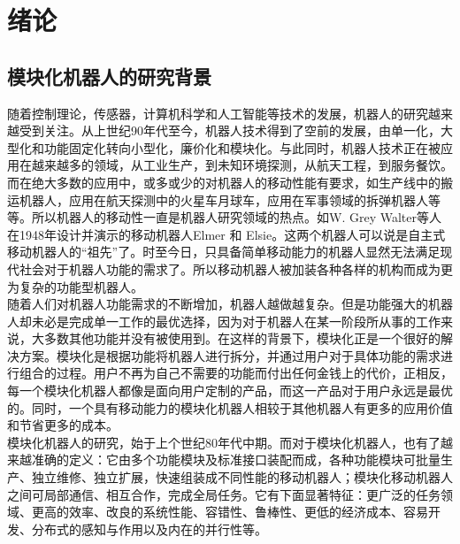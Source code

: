 
\chapter{绪论}
\label{chap:introduction}

\section{模块化机器人的研究背景}

随着控制理论，传感器，计算机科学和人工智能等技术的发展，机器人的研究越来越受到关注。从上世纪90年代至今，机器人技术得到了空前的发展，由单一化，大型化和功能固定化转向小型化，廉价化和模块化。与此同时，机器人技术正在被应用在越来越多的领域，从工业生产，到未知环境探测，从航天工程，到服务餐饮。而在绝大多数的应用中，或多或少的对机器人的移动性能有要求，如生产线中的搬运机器人，应用在航天探测中的火星车月球车，应用在军事领域的拆弹机器人等等。所以机器人的移动性一直是机器人研究领域的热点。如W. Grey Walter等人在1948年设计并演示的移动机器人Elmer 和 Elsie。这两个机器人可以说是自主式移动机器人的“祖先”了。时至今日，只具备简单移动能力的机器人显然无法满足现代社会对于机器人功能的需求了。所以移动机器人被加装各种各样的机构而成为更为复杂的功能型机器人。 \\
随着人们对机器人功能需求的不断增加，机器人越做越复杂。但是功能强大的机器人却未必是完成单一工作的最优选择，因为对于机器人在某一阶段所从事的工作来说，大多数其他功能并没有被使用到。在这样的背景下，模块化正是一个很好的解决方案。模块化是根据功能将机器人进行拆分，并通过用户对于具体功能的需求进行组合的过程。用户不再为自己不需要的功能而付出任何金钱上的代价，正相反，每一个模块化机器人都像是面向用户定制的产品，而这一产品对于用户永远是最优的。同时，一个具有移动能力的模块化机器人相较于其他机器人有更多的应用价值和节省更多的成本。 \\
模块化机器人的研究，始于上个世纪80年代中期。而对于模块化机器人，也有了越来越准确的定义：它由多个功能模块及标准接口装配而成，各种功能模块可批量生产、独立维修、独立扩展，快速组装成不同性能的移动机器人；模块化移动机器人之间可局部通信、相互合作，完成全局任务。它有下面显著特征：更广泛的任务领域、更高的效率、改良的系统性能、容错性、鲁棒性、更低的经济成本、容易开发、分布式的感知与作用以及内在的并行性等。  \\
